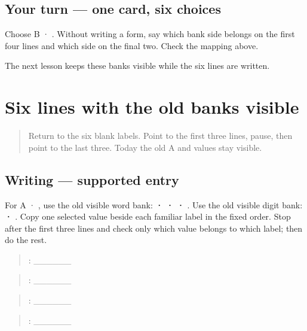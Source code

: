 \subsection*{Your turn — one card, six choices}
Choose B · . Without writing a form, say which bank side belongs on the first four lines and which side on the final two. Check the mapping above.

\begin{tcolorbox}[breakable,colback=teal!4,colframe=teal!35!black,title={Before you move on}]
The next lesson keeps these banks visible while the six lines are written.
\end{tcolorbox}
\section[\texorpdfstring{\pa{ਨਾਂ}: \pa{ਅਮਨ} · \pa{ਭਾਸ਼ਾ} … (supported …)}{ਨਾਂ: ਅਮਨ · ਭਾਸ਼ਾ … (supported …)}]{Six lines with the old banks visible}

\label{lesson:PA-W11-form-six-supported}



\begin{quote}
Return to the six blank labels. Point to the first three lines, pause, then point to the last three. Today the old A and  values stay visible.
\end{quote}

\subsection*{Writing — supported entry}
For A · , use the old visible word bank: \textbf{ ·  ·  · }. Use the old visible digit bank: \textbf{ ·  }. Copy one selected value beside each familiar label in the fixed order. Stop after the first three lines and check only which value belongs to which label; then do the rest.

\begin{quote}
: \_\_\_\_\_\_
\end{quote}

\begin{quote}
: \_\_\_\_\_\_
\end{quote}

\begin{quote}
: \_\_\_\_\_\_
\end{quote}

\begin{quote}
: \_\_\_\_\_\_
\end{quote}

